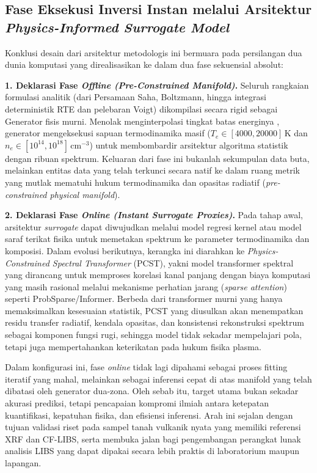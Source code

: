 \documentclass[10pt,leqno]{amsart}
\begin{document}
\subsection{Fase Eksekusi Inversi Instan melalui Arsitektur \textit{Physics-Informed Surrogate Model}} \label{sec:surrogate}

Konklusi desain dari arsitektur metodologis ini bermuara pada persilangan dua dunia komputasi yang direalisasikan ke dalam dua fase sekuensial absolut:

\textbf{1. Deklarasi Fase \textit{Offline (Pre-Constrained Manifold)}.} Seluruh rangkaian formulasi analitik (dari Persamaan Saha, Boltzmann, hingga integrasi deterministik RTE dan pelebaran Voigt) dikompilasi secara rigid sebagai Generator fisis murni. Menolak menginterpolasi tingkat batas energinya \cite{favre_towards_2025}, generator mengeksekusi sapuan termodinamika masif ($T_e \in [4000, 20000]$\,K dan $n_e \in [10^{14}, 10^{18}]$\,cm$^{-3}$) untuk membombardir arsitektur algoritma statistik dengan ribuan spektrum. Keluaran dari fase ini bukanlah sekumpulan data buta, melainkan entitas data yang telah terkunci secara natif ke dalam ruang metrik yang mutlak mematuhi hukum termodinamika dan opasitas radiatif (\textit{pre-constrained physical manifold}).

\textbf{2. Deklarasi Fase \textit{Online (Instant Surrogate Proxies)}.} Pada tahap awal, arsitektur \textit{surrogate} dapat diwujudkan melalui model regresi kernel atau model saraf terikat fisika untuk memetakan spektrum ke parameter termodinamika dan komposisi. Dalam evolusi berikutnya, kerangka ini diarahkan ke \textit{Physics-Constrained Spectral Transformer} (PCST), yakni model transformer spektral yang dirancang untuk memproses korelasi kanal panjang dengan biaya komputasi yang masih rasional melalui mekanisme perhatian jarang (\textit{sparse attention}) seperti ProbSparse/Informer. Berbeda dari transformer murni yang hanya memaksimalkan kesesuaian statistik, PCST yang diusulkan akan menempatkan residu transfer radiatif, kendala opasitas, dan konsistensi rekonstruksi spektrum sebagai komponen fungsi rugi, sehingga model tidak sekadar mempelajari pola, tetapi juga mempertahankan keterikatan pada hukum fisika plasma.

Dalam konfigurasi ini, fase \textit{online} tidak lagi dipahami sebagai proses fitting iteratif yang mahal, melainkan sebagai inferensi cepat di atas manifold yang telah dibatasi oleh generator dua-zona. Oleh sebab itu, target utama bukan sekadar akurasi prediksi, tetapi pencapaian kompromi ilmiah antara ketepatan kuantifikasi, kepatuhan fisika, dan efisiensi inferensi. Arah ini sejalan dengan tujuan validasi riset pada sampel tanah vulkanik nyata yang memiliki referensi XRF dan CF-LIBS, serta membuka jalan bagi pengembangan perangkat lunak analisis LIBS yang dapat dipakai secara lebih praktis di laboratorium maupun lapangan.



\end{document}
